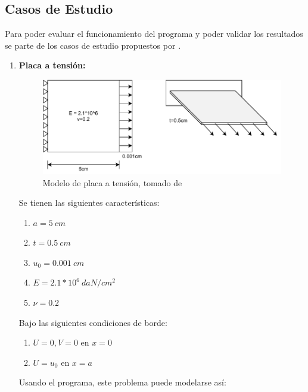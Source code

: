 	\subsection{Casos de Estudio}
	\label{sub:casosestudio}
	Para poder evaluar el funcionamiento del programa y poder validar los resultados se parte de los casos de estudio propuestos por \cite{Pisano2009}.

	\begin{enumerate}
		\item \textbf{Placa a tensión:}

		\begin{figure}
			\centering
			\sffamily
			\includegraphics[width=\textwidth]{figuras/placa.pdf}
			\caption{Modelo de placa a tensión, tomado de \cite{Pisano2009}}
			\label{fig:placa_tension}
		\end{figure}

		Se tienen las siguientes características:
		\begin{enumerate}
			\item[] $a = 5\ cm$
			\item[] $t = 0.5\ cm$
			\item[] $u_0 = 0.001\ cm$
			\item[] $E = 2.1*10^6\ daN/cm^2$
			\item[] $\nu = 0.2$
		\end{enumerate}

		Bajo las siguientes condiciones de borde:
		\begin{enumerate}
			\item[] $U = 0,V=0$ en $x=0$
			\item[] $U = u_0$ en $x=a$
		\end{enumerate}

		Usando el programa, este problema puede modelarse así:


\end{enumerate}
